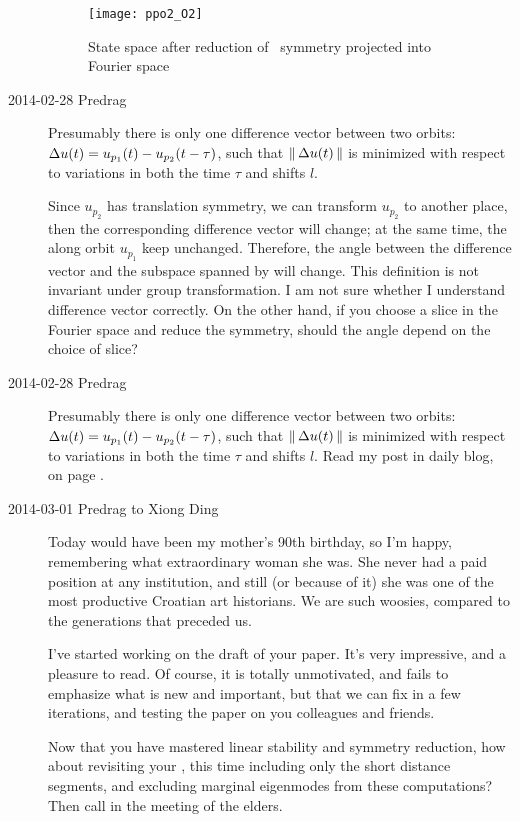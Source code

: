 \begin{description}
\begin{figure}[h]
  \centering
  \texttt{[image: ppo2\_O2]}
  \caption{State  space after reduction of \ symmetry projected into
  Fourier space}
  \label{fig:ppo2_O2}
\end{figure}

\item[2014-02-28 Predrag]

Presumably there is only one difference vector between
two orbits: $\Delta u(t)=u_{p_1}(t)-u_{p_2}(t-\tau)$, such that
$\left\Arrowvert \, \Delta u(t) \, \right\Arrowvert$ is minimized with respect to variations in both
the time $\tau$ and shifts $l$.


Since $u_{p_2}$ has
translation symmetry, we can transform $u_{p_2}$ to another place,
then the corresponding difference vector will change; at the same time,
the {\cLvs} along orbit $u_{p_1}$ keep unchanged. Therefore,
the angle between the difference vector and the subspace spanned by
{\cLvs} will change. This definition is not invariant
under group transformation. I am not
sure whether I understand difference vector correctly.
On the other hand, if you choose a slice in the Fourier space and
reduce the  symmetry, should the angle depend on the choice of
slice?

\item[2014-02-28 Predrag]
Presumably there is only one difference vector between
two orbits: $\Delta u(t)=u_{p_1}(t)-u_{p_2}(t-\tau)$, such that
$\left\Arrowvert \, \Delta u(t) \, \right\Arrowvert$ is minimized with respect to variations in both
the time $\tau$ and shifts $l$. Read my post in daily blog,
on page \pageref{2014-03-01PC}.

\item[2014-03-01 Predrag to Xiong Ding]
Today would have been my mother's 90th birthday, so I'm happy,
remembering what extraordinary woman she was. She never had a paid position
at any institution, and still (or because of it) she was one of the most
productive Croatian art historians. We are such woosies, compared to
the generations that preceded us.

I've started working on the draft of your paper.
It's very impressive, and a pleasure to read. Of course, it is totally
unmotivated, and fails to emphasize what is new and important, but that we
can fix in a few iterations, and testing the paper on you colleagues and friends.

Now that you have mastered linear stability and symmetry reduction,
how about revisiting your , this time including only the
short distance segments, and excluding marginal eigenmodes from these
computations?
Then call in the meeting of the elders.


\end{description}
